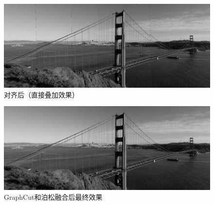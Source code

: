 \documentclass[11pt,a4paper]{article}
\begin{document}
\begin{figure}[H]
    \centering
    \includegraphics[width=1.0\textwidth]{../output/golden_paste.jpg}
    \caption{对齐后（直接叠加效果）}
    \label{fig:golden_align}
\end{figure}

\begin{figure}[H]
    \centering
    \includegraphics[width=1.0\textwidth]{../output/golden_poisson.jpg}
    \caption{GraphCut和泊松融合后最终效果}
    \label{fig:golden_poisson}
\end{figure}



\end{document}
